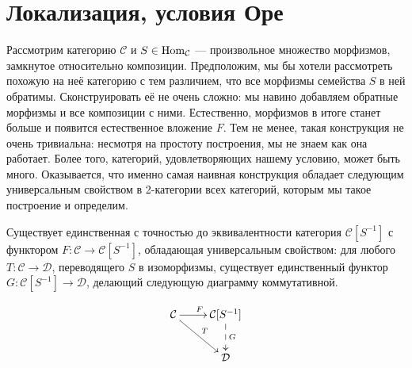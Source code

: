 \documentclass[../main.tex]{subfiles}
\begin{document}
\section{Локализация, условия Оре}
Рассмотрим категорию $\mathcal{C}$ и $S\in \operatorname{Hom}_\mathcal{C}$ --- произвольное множество морфизмов, замкнутое относительно композиции. 
Предположим, мы бы хотели рассмотреть похожую на неё категорию с тем различием, что все морфизмы семейства $S$ в ней обратимы. 
Сконструировать её не очень сложно: мы навино добавляем обратные морфизмы и все композиции с ними. 
Естественно, морфизмов в итоге станет больше и появится естественное вложение $F$. 
Тем не менее, такая конструкция не очень тривиальна: несмотря на простоту построения, мы не знаем как она работает. 
Более того, категорий, удовлетворяющих нашему условию, может быть много. 
Оказывается, что именно самая наивная конструкция обладает следующим универсальным свойством в 2-категории всех категорий, которым мы такое построение и определим.

\begin{to_suj}
  Существует единственная с точностью до эквивалентности категория $\mathcal{C}[S^{-1}]$ с функтором $F:\mathcal{C}\to \mathcal{C}[S^{-1}]$, обладающая универсальным свойством: для любого $T:\mathcal{C}\to \mathcal{D}$, переводящего $S$ в изоморфизмы, существует единственный функтор $G:\mathcal{C}[S^{-1}] \to \mathcal{D}$, делающий следующую диаграмму коммутативной.

  \begin{equation}\label{loc_univ}
  \xymatrix{
      \mathcal{C}\ar[rd]^T \ar[r]^F & \mathcal{C}[S^{-1}]\ar@{-->}[d]^G\\
  & \mathcal{D} }
\end{equation}

\end{to_suj}
\end{document}
